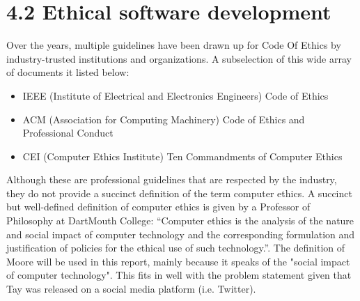 \section*{\textbf{4.2 Ethical software development}}
Over the years, multiple guidelines have been drawn up for Code Of Ethics by industry-trusted institutions and organizations. A subselection of this wide array of documents it listed below:
\begin{itemize}
	\item IEEE (Institute of Electrical and Electronics Engineers) Code of Ethics\cite{IEEE}
	\item ACM (Association for Computing Machinery) Code of Ethics and Professional Conduct\cite{ACM}
	\item CEI (Computer Ethics Institute) Ten Commandments of Computer Ethics\cite{CEI}
\end{itemize}
Although these are professional guidelines that are respected by the industry, they do not provide a succinct definition of the term computer ethics. A succinct but well-defined definition of computer ethics is given by a Professor of Philosophy at DartMouth College: “Computer ethics is the analysis of the nature and social impact of computer technology and the corresponding formulation and justification of policies for the ethical use of such technology.”\cite{Moor}.
The definition of Moore will be used in this report, mainly because it speaks of the "social impact of computer technology". This fits in well with the problem statement given that Tay was released on a social media platform (i.e. Twitter).
